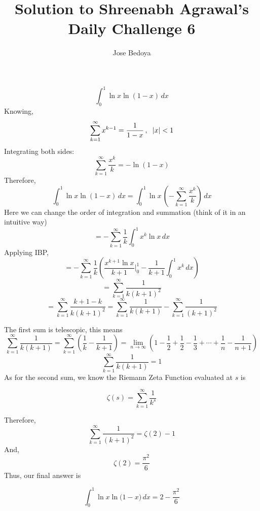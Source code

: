 \documentclass{article}
\begin{document}
\title{Solution to Shreenabh Agrawal's Daily Challenge 6}
\author{Jose Bedoya}
\maketitle

\vspace{10mm}

{\small

$$\int_{0}^{1} \ln{x}\ln{(1-x)}\,dx$$
\vspace{5mm}
Knowing,
$$\sum_{k=1}^{\infty} x^{k-1} = \frac{1}{1-x}\,, \hspace{2mm} |x|<1$$
Integrating both sides:
$$\sum_{k=1}^{\infty} \frac{x^k}{k} = -\ln{(1-x)}$$
Therefore,
$$\int_{0}^{1} \ln{x}\ln{(1-x)}\,dx = \int_{0}^{1} \ln{x}\,\left(-\sum_{k=1}^{\infty} \frac{x^k}{k}\right)\,dx$$
Here we can change the order of integration and summation (think of it in an intuitive way)
$$= -\sum_{k=1}^{\infty}\frac{1}{k}\int_{0}^{1} x^k\ln{x}\,dx$$
Applying IBP,
$$=-\sum_{k=1}^{\infty} \frac{1}{k}\left(\frac{x^{k+1}\ln x}{k+1}\Big|_0^1 -\frac{1}{k+1}\int_{0}^{1}x^{k} \,dx \right)$$
$$=\sum_{k=1}^{\infty} \frac{1}{k(k+1)^2}$$
$$=\sum_{k=1}^{\infty} \frac{k+1-k}{k(k+1)^2}=\sum_{k=1}^{\infty}\frac{1}{k(k+1)} - \sum_{k=1}^{\infty}\frac{1}{(k+1)^2}$$

\vspace{2mm}
The first sum is telescopic, this means
$$\sum_{k=1}^{\infty}\frac{1}{k(k+1)}=\sum_{k=1}^{\infty} \left(\frac{1}{k}-\frac{1}{k+1}\right)= \lim_{n\to\infty}\left(1-\frac{1}{2}+\frac{1}{2}-\frac{1}{3}+\cdots + \frac{1}{n}-\frac{1}{n+1}\right)$$
$$\sum_{k=1}^{\infty}\frac{1}{k(k+1)}=1$$
As for the second sum, we know the Riemann Zeta Function evaluated at $s$ is 

$$\zeta(s)=\sum_{k=1}^{\infty} \frac{1}{k^s}$$

Therefore,
$$\sum_{k=1}^{\infty} \frac{1}{(k+1)^2}=\zeta(2)-1$$
And,
$$\zeta(2)=\frac{\pi^2}{6}$$
Thus, our final answer is

$$\int_{0}^{1} \ln x \ln{(1-x})\,dx = 2-\frac{\pi^2}{6}$$
}
\end{document}
